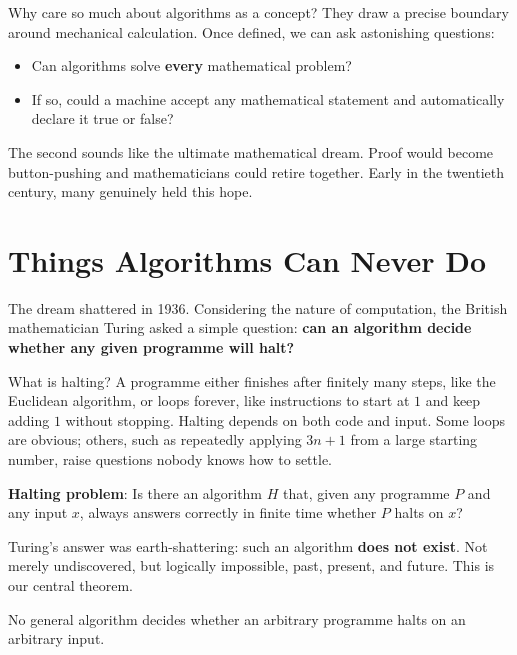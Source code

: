 Why care so much about algorithms as a concept? They draw a precise boundary around mechanical calculation. Once defined, we can ask astonishing questions:

\begin{itemize}
\item Can algorithms solve \textbf{every} mathematical problem?
\item If so, could a machine accept any mathematical statement and automatically declare it true or false?
\end{itemize}

The second sounds like the ultimate mathematical dream. Proof would become button-pushing and mathematicians could retire together. Early in the twentieth century, many genuinely held this hope.

\section{Things Algorithms Can Never Do}

The dream shattered in 1936. Considering the nature of computation, the British mathematician Turing asked a simple question: \textbf{can an algorithm decide whether any given programme will halt?}

What is halting? A programme either finishes after finitely many steps, like the Euclidean algorithm, or loops forever, like instructions to start at $1$ and keep adding $1$ without stopping. Halting depends on both code and input. Some loops are obvious; others, such as repeatedly applying $3n+1$ from a large starting number, raise questions nobody knows how to settle.

\begin{dingyi}
\textbf{Halting problem}: Is there an algorithm $H$ that, given any programme $P$ and any input $x$, always answers correctly in finite time whether $P$ halts on $x$?
\end{dingyi}

Turing's answer was earth-shattering: such an algorithm \textbf{does not exist}. Not merely undiscovered, but logically impossible, past, present, and future. This is our central theorem.

\begin{dingli}
No general algorithm decides whether an arbitrary programme halts on an arbitrary input.
\end{dingli}

